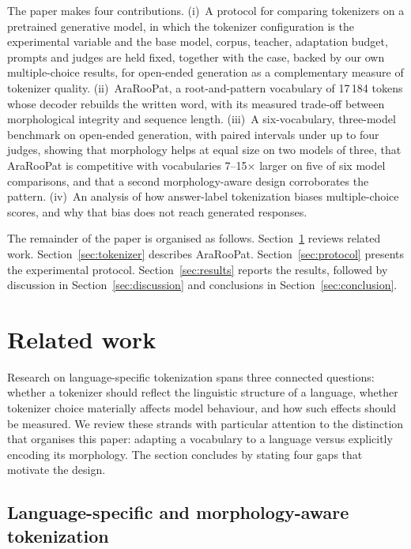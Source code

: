 \documentclass[a4paper,fleqn]{cas-sc}
\begin{document}
The paper makes four contributions. (i)~A protocol for comparing tokenizers on a pretrained generative model, in which the tokenizer configuration is the experimental variable and the base model, corpus, teacher, adaptation budget, prompts and judges are held fixed, together with the case, backed by our own multiple-choice results, for open-ended generation as a complementary measure of tokenizer quality. (ii)~AraRooPat, a root-and-pattern vocabulary of 17\,184 tokens whose decoder rebuilds the written word, with its measured trade-off between morphological integrity and sequence length. (iii)~A six-vocabulary, three-model benchmark on open-ended generation, with paired intervals under up to four judges, showing that morphology helps at equal size on two models of three, that AraRooPat is competitive with vocabularies 7--15$\times$ larger on five of six model comparisons, and that a second morphology-aware design corroborates the pattern. (iv)~An analysis of how answer-label tokenization biases multiple-choice scores, and why that bias does not reach generated responses.

The remainder of the paper is organised as follows. Section~\ref{sec:related} reviews related work. Section~\ref{sec:tokenizer} describes AraRooPat. Section~\ref{sec:protocol} presents the experimental protocol. Section~\ref{sec:results} reports the results, followed by discussion in Section~\ref{sec:discussion} and conclusions in Section~\ref{sec:conclusion}.

\section{Related work}
\label{sec:related}

Research on language-specific tokenization spans three connected questions: whether a tokenizer should reflect the linguistic structure of a language, whether tokenizer choice materially affects model behaviour, and how such effects should be measured. We review these strands with particular attention to the distinction that organises this paper: adapting a vocabulary to a language versus explicitly encoding its morphology. The section concludes by stating four gaps that motivate the design.

\subsection{Language-specific and morphology-aware tokenization}
\label{sec:related:morpho}
\end{document}
